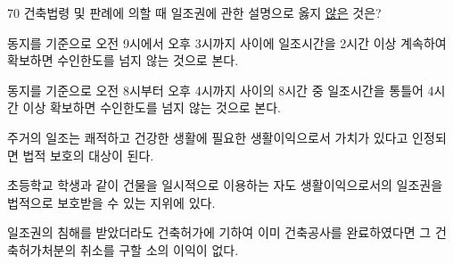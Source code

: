 \begin{question}{70}
건축법령 및 판례에 의할 때 일조권에 관한 설명으로 옳지 \uline{않은} 것은?
\begin{choices}
  \item 동지를 기준으로 오전 9시에서 오후 3시까지 사이에 일조시간을 2시간 이상 계속하여 확보하면 수인한도를 넘지 않는 것으로 본다.
  \item 동지를 기준으로 오전 8시부터 오후 4시까지 사이의 8시간 중 일조시간을 통틀어 4시간 이상 확보하면 수인한도를 넘지 않는 것으로 본다.
  \item 주거의 일조는 쾌적하고 건강한 생활에 필요한 생활이익으로서 가치가 있다고 인정되면 법적 보호의 대상이 된다.
  \item 초등학교 학생과 같이 건물을 일시적으로 이용하는 자도 생활이익으로서의 일조권을 법적으로 보호받을 수 있는 지위에 있다.
  \item 일조권의 침해를 받았더라도 건축허가에 기하여 이미 건축공사를 완료하였다면 그 건축허가처분의 취소를 구할 소의 이익이 없다.
\end{choices}
\end{question}
